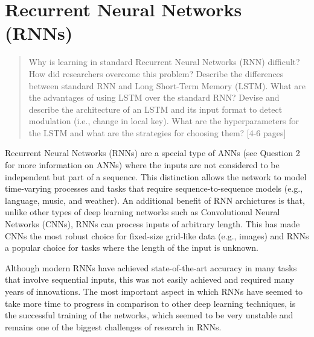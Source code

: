 \chapter{Recurrent Neural Networks (RNNs)}
\label{chap:chap9}

\begin{quote}
    Why is learning in standard Recurrent Neural Networks (RNN) difficult? How did researchers overcome this problem? Describe the differences between standard RNN and Long Short-Term Memory (LSTM). What are the advantages of using LSTM over the standard RNN? Devise and describe the architecture of an LSTM and its input format to detect modulation (i.e., change in local key). What are the hyperparameters for the LSTM and what are the strategies for choosing them? [4-6 pages]
\end{quote}
\clearpage






Recurrent Neural Networks (RNNs) are a special type of ANNs (see Question 2 for more information on ANNs) where the inputs are not considered to be independent but part of a sequence. This distinction allows the network to model time-varying processes and tasks that require sequence-to-sequence models (e.g., language, music, and weather). An additional benefit of RNN archictures is that, unlike other types of deep learning networks such as Convolutional Neural Networks (CNNs), RNNs can process inputs of arbitrary length. This has made CNNs the most robust choice for fixed-size grid-like data (e.g., images) and RNNs a popular choice for tasks where the length of the input is unknown. 

Although modern RNNs have achieved state-of-the-art accuracy in many tasks that involve sequential inputs, this was not easily achieved and required many years of innovations. The most important aspect in which RNNs have seemed to take more time to progress in comparison to other deep learning techniques, is the successful training of the networks, which seemed to be very unstable and remains one of the biggest challenges of research in RNNs.

